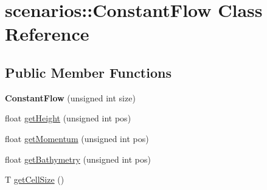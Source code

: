 \hypertarget{classscenarios_1_1ConstantFlow}{\section{scenarios\-:\-:Constant\-Flow Class Reference}
\label{classscenarios_1_1ConstantFlow}
}
\subsection*{Public Member Functions}
\begin{DoxyCompactItemize}
\item 
\hypertarget{classscenarios_1_1ConstantFlow_a1e8c65ce5599803dd3ef03685437571a}{{\bfseries Constant\-Flow} (unsigned int size)}\label{classscenarios_1_1ConstantFlow_a1e8c65ce5599803dd3ef03685437571a}

\item 
float \hyperlink{classscenarios_1_1ConstantFlow_aeabe36e60b80a08ae5f5c48bbb3a8075}{get\-Height} (unsigned int pos)
\item 
float \hyperlink{classscenarios_1_1ConstantFlow_a30d1299aaedace7e0f4f73dc9ef7b96e}{get\-Momentum} (unsigned int pos)
\item 
float \hyperlink{classscenarios_1_1ConstantFlow_ae4637ce758740c94f9909fa24181e331}{get\-Bathymetry} (unsigned int pos)
\item 
T \hyperlink{classscenarios_1_1ConstantFlow_ad1fc628b5982edc6217c12a9dbaaa3ac}{get\-Cell\-Size} ()
\end{DoxyCompactItemize}


